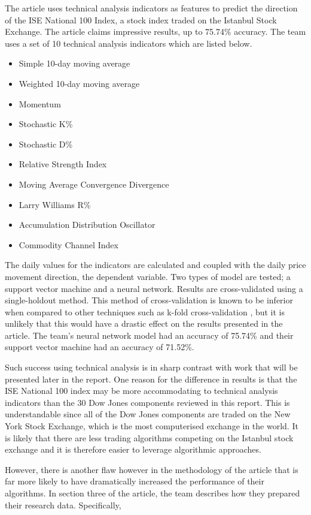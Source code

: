 \documentclass{report}
\begin{document}
The article uses technical analysis indicators as features to predict the direction of the ISE National 100 Index, a stock index traded on the Istanbul Stock Exchange. The article claims impressive results, up to 75.74\% accuracy. The team uses a set of 10 technical analysis indicators which are listed below.

\begin{itemize}[noitemsep]
  \item Simple 10-day moving average
  \item Weighted 10-day moving average
  \item Momentum
  \item Stochastic K\%
  \item Stochastic D\%
  \item Relative Strength Index
  \item Moving Average Convergence Divergence
  \item Larry Williams R\%
  \item Accumulation Distribution Oscillator
  \item Commodity Channel Index
\end{itemize}

The daily values for the indicators are calculated and coupled with the daily price movement direction, the dependent variable. Two types of model are tested; a support vector machine and a neural network. Results are cross-validated using a single-holdout method. This method of cross-validation is known to be inferior when compared to other techniques such as k-fold cross-validation \cite{kohavi1995study}, but it is unlikely that this would have a drastic effect on the results presented in the article. The team's neural network model had an accuracy of 75.74\% and their support vector machine had an accuracy of 71.52\%.

Such success using technical analysis is in sharp contrast with work that will be presented later in the report. One reason for the difference in results is that the ISE National 100 index may be more accommodating to technical analysis indicators than the 30 Dow Jones components reviewed in this report. This is understandable since all of the Dow Jones components are traded on the New York Stock Exchange, which is the most computerised exchange in the world. It is likely that there are less trading algorithms competing on the Istanbul stock exchange and it is therefore easier to leverage algorithmic approaches. 

However, there is another flaw however in the methodology of the article that is far more likely to have dramatically increased the performance of their algorithms. In section three of the article, the team describes how they prepared their research data. Specifically, 
\end{document}
